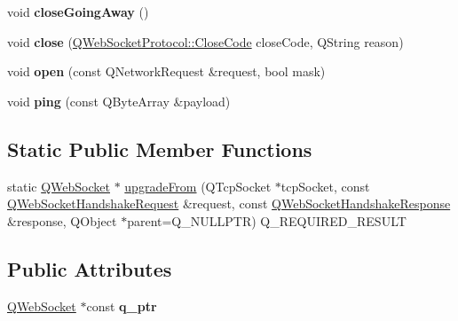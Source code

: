 \begin{DoxyCompactItemize}
\item 
\mbox{\label{class_q_web_socket_private_a473ede3840d932eb331c944382dc9d81}} 
void {\bfseries close\+Going\+Away} ()
\item 
\mbox{\label{class_q_web_socket_private_af1bcf67391b8730dae6f7a1c26f2a69b}} 
void {\bfseries close} (\mbox{\hyperlink{namespace_q_web_socket_protocol_a9f236676f594451d8d723f260b71028c}{Q\+Web\+Socket\+Protocol\+::\+Close\+Code}} close\+Code, Q\+String reason)
\item 
\mbox{\label{class_q_web_socket_private_a39237724e117926574d8b497a7d06edb}} 
void {\bfseries open} (const Q\+Network\+Request \&request, bool mask)
\item 
\mbox{\label{class_q_web_socket_private_ae62c3def650e86d8117e859a8811e83b}} 
void {\bfseries ping} (const Q\+Byte\+Array \&payload)
\end{DoxyCompactItemize}
\subsection*{Static Public Member Functions}
\begin{DoxyCompactItemize}
\item 
static \mbox{\hyperlink{class_q_web_socket}{Q\+Web\+Socket}} $\ast$ \mbox{\hyperlink{class_q_web_socket_private_a5c867be71bd2e6a66136cab1d954e611}{upgrade\+From}} (Q\+Tcp\+Socket $\ast$tcp\+Socket, const \mbox{\hyperlink{class_q_web_socket_handshake_request}{Q\+Web\+Socket\+Handshake\+Request}} \&request, const \mbox{\hyperlink{class_q_web_socket_handshake_response}{Q\+Web\+Socket\+Handshake\+Response}} \&response, Q\+Object $\ast$parent=Q\+\_\+\+N\+U\+L\+L\+P\+TR) Q\+\_\+\+R\+E\+Q\+U\+I\+R\+E\+D\+\_\+\+R\+E\+S\+U\+LT
\end{DoxyCompactItemize}
\subsection*{Public Attributes}
\begin{DoxyCompactItemize}
\item 
\mbox{\label{class_q_web_socket_private_a59ebaa78c5179e1d54777f2919d8b895}} 
\mbox{\hyperlink{class_q_web_socket}{Q\+Web\+Socket}} $\ast$const {\bfseries q\+\_\+ptr}
\end{DoxyCompactItemize}
